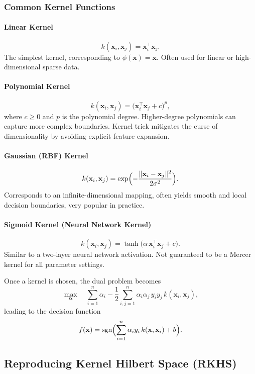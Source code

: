 \documentclass[11pt]{article}
\begin{document}
\subsubsection{Common Kernel Functions}

\paragraph{Linear Kernel}
\[
k(\mathbf{x}_i, \mathbf{x}_j) = \mathbf{x}_i^\top \mathbf{x}_j.
\]
The simplest kernel, corresponding to \(\phi(\mathbf{x}) = \mathbf{x}\). Often used for linear or high-dimensional sparse data.

\paragraph{Polynomial Kernel}
\[
k(\mathbf{x}_i, \mathbf{x}_j) 
= \bigl(\mathbf{x}_i^\top \mathbf{x}_j + c\bigr)^p,
\]
where \(c \ge 0\) and \(p\) is the polynomial degree. Higher-degree polynomials can capture more complex boundaries. Kernel trick mitigates the curse of dimensionality by avoiding explicit feature expansion.

\paragraph{Gaussian (RBF) Kernel}
\[
k(\mathbf{x}_i, \mathbf{x}_j) 
= \exp\Bigl(-\frac{\|\mathbf{x}_i - \mathbf{x}_j\|^2}{2\sigma^2}\Bigr).
\]
Corresponds to an infinite-dimensional mapping, often yields smooth and local decision boundaries, very popular in practice.

\paragraph{Sigmoid Kernel (Neural Network Kernel)}
\[
k(\mathbf{x}_i, \mathbf{x}_j) 
= \tanh\bigl(\alpha \,\mathbf{x}_i^\top \mathbf{x}_j + c\bigr).
\]
Similar to a two-layer neural network activation. Not guaranteed to be a Mercer kernel for all parameter settings.

Once a kernel is chosen, the dual problem becomes
\[
\max_{\boldsymbol{\alpha}} 
\quad \sum_{i=1}^n \alpha_i 
- \frac{1}{2}\sum_{i,j=1}^n \alpha_i \alpha_j \,y_i y_j \, k(\mathbf{x}_i, \mathbf{x}_j),
\]
leading to the decision function
\[
f(\mathbf{x}) 
= \text{sgn}\Bigl(\sum_{i=1}^n \alpha_i y_i\,k(\mathbf{x}, \mathbf{x}_i) + b\Bigr).
\]

\subsection{Reproducing Kernel Hilbert Space (RKHS)}
\label{subsec:rkhs}
\end{document}
